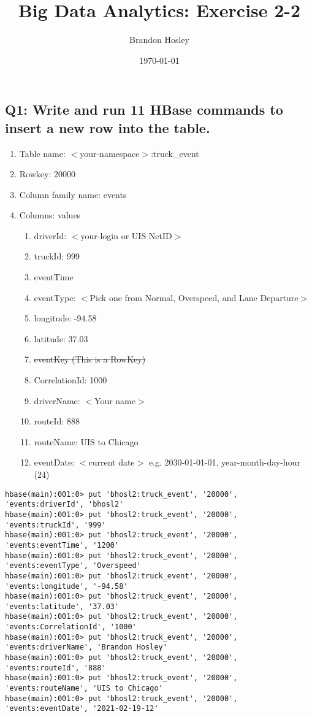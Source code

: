 \documentclass[]{article}
\title{Big Data Analytics: Exercise 2-2}
\author{Brandon Hosley}
\date{\today}
\begin{document}
\maketitle

\subsection*{Q1: Write and run 11 HBase commands to insert a new row into the table.} 
\begin{enumerate}[before=\itshape,font=\normalfont,label=\alph*.]
	\item Table name: $<$your-namespace$>$:truck\_event
	\item Rowkey: 20000
	\item Column family name: events
	\item Columns: values
	\begin{enumerate}[label=\roman*.]
		\item driverId: $<$your-login or UIS NetID$>$
		\item truckId: 999
		\item eventTime
		\item eventType: $<$Pick one from Normal, Overspeed, and Lane Departure$>$
		\item longitude: -94.58
		\item latitude: 37.03
		\item \sout{ eventKey (This is a RowKey) }
		\item CorrelationId: 1000
		\item driverName: $<$Your name$>$
		\item routeId: 888
		\item routeName: UIS to Chicago
		\item eventDate: $<$current date$>$ e.g. 2030-01-01-01, year-month-day-hour (24)
	\end{enumerate}
\end{enumerate}

\begin{verbatim}
hbase(main):001:0> put 'bhosl2:truck_event', '20000', 'events:driverId', 'bhosl2'
hbase(main):001:0> put 'bhosl2:truck_event', '20000', 'events:truckId', '999'
hbase(main):001:0> put 'bhosl2:truck_event', '20000', 'events:eventTime', '1200'
hbase(main):001:0> put 'bhosl2:truck_event', '20000', 'events:eventType', 'Overspeed'
hbase(main):001:0> put 'bhosl2:truck_event', '20000', 'events:longitude', '-94.58'
hbase(main):001:0> put 'bhosl2:truck_event', '20000', 'events:latitude', '37.03'
hbase(main):001:0> put 'bhosl2:truck_event', '20000', 'events:CorrelationId', '1000'
hbase(main):001:0> put 'bhosl2:truck_event', '20000', 'events:driverName', 'Brandon Hosley'
hbase(main):001:0> put 'bhosl2:truck_event', '20000', 'events:routeId', '888'
hbase(main):001:0> put 'bhosl2:truck_event', '20000', 'events:routeName', 'UIS to Chicago'
hbase(main):001:0> put 'bhosl2:truck_event', '20000', 'events:eventDate', '2021-02-19-12'
\end{verbatim}
\end{document}
